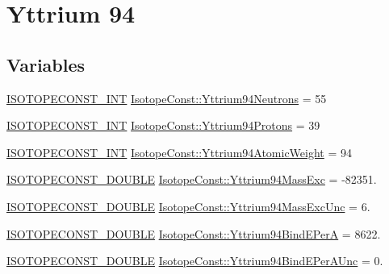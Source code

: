 \hypertarget{group___isotope_const-_yttrium-_y94}{}\section{Yttrium 94}
\label{group___isotope_const-_yttrium-_y94}
\subsection*{Variables}
\begin{DoxyCompactItemize}
\item 
\mbox{\hyperlink{group___isotope_const-_macros_ga5f18360b3e99483a35c32d789e62621c}{I\+S\+O\+T\+O\+P\+E\+C\+O\+N\+S\+T\+\_\+\+I\+NT}} \mbox{\hyperlink{group___isotope_const-_yttrium-_y94_ga053f964ec0472e51b2c0e29555f42a8b}{Isotope\+Const\+::\+Yttrium94\+Neutrons}} = 55
\item 
\mbox{\hyperlink{group___isotope_const-_macros_ga5f18360b3e99483a35c32d789e62621c}{I\+S\+O\+T\+O\+P\+E\+C\+O\+N\+S\+T\+\_\+\+I\+NT}} \mbox{\hyperlink{group___isotope_const-_yttrium-_y94_gadc23bdcb794fc403f4d53168a8a958ab}{Isotope\+Const\+::\+Yttrium94\+Protons}} = 39
\item 
\mbox{\hyperlink{group___isotope_const-_macros_ga5f18360b3e99483a35c32d789e62621c}{I\+S\+O\+T\+O\+P\+E\+C\+O\+N\+S\+T\+\_\+\+I\+NT}} \mbox{\hyperlink{group___isotope_const-_yttrium-_y94_ga33c462cbc57cb4374653e5cbed86a90c}{Isotope\+Const\+::\+Yttrium94\+Atomic\+Weight}} = 94
\item 
\mbox{\hyperlink{group___isotope_const-_macros_ga8f45a7272ce02c0b4c65c44636ed719a}{I\+S\+O\+T\+O\+P\+E\+C\+O\+N\+S\+T\+\_\+\+D\+O\+U\+B\+LE}} \mbox{\hyperlink{group___isotope_const-_yttrium-_y94_ga0607cc16cba9debc28887c5450e78c76}{Isotope\+Const\+::\+Yttrium94\+Mass\+Exc}} = -\/82351.
\item 
\mbox{\hyperlink{group___isotope_const-_macros_ga8f45a7272ce02c0b4c65c44636ed719a}{I\+S\+O\+T\+O\+P\+E\+C\+O\+N\+S\+T\+\_\+\+D\+O\+U\+B\+LE}} \mbox{\hyperlink{group___isotope_const-_yttrium-_y94_ga6a49264f320e023b9fa30bdd433bf137}{Isotope\+Const\+::\+Yttrium94\+Mass\+Exc\+Unc}} = 6.
\item 
\mbox{\hyperlink{group___isotope_const-_macros_ga8f45a7272ce02c0b4c65c44636ed719a}{I\+S\+O\+T\+O\+P\+E\+C\+O\+N\+S\+T\+\_\+\+D\+O\+U\+B\+LE}} \mbox{\hyperlink{group___isotope_const-_yttrium-_y94_ga14187fca18501551753f5c8ab6b6a689}{Isotope\+Const\+::\+Yttrium94\+Bind\+E\+PerA}} = 8622.
\item 
\mbox{\hyperlink{group___isotope_const-_macros_ga8f45a7272ce02c0b4c65c44636ed719a}{I\+S\+O\+T\+O\+P\+E\+C\+O\+N\+S\+T\+\_\+\+D\+O\+U\+B\+LE}} \mbox{\hyperlink{group___isotope_const-_yttrium-_y94_ga0828ec26833660969073deafdb5849fe}{Isotope\+Const\+::\+Yttrium94\+Bind\+E\+Per\+A\+Unc}} = 0.

\end{DoxyCompactItemize}
